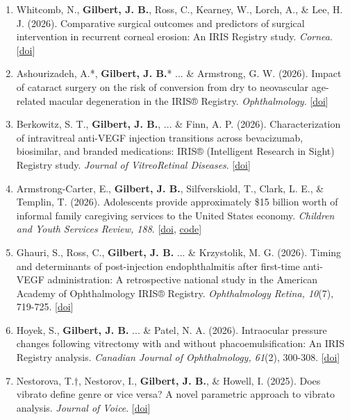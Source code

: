\documentclass[11pt]{article}
\begin{document}
\begin{enumerate}
\item Whitcomb, N., \textbf{Gilbert, J. B.}, Ross, C., Kearney, W., Lorch, A., \& Lee, H. J. (2026). Comparative surgical outcomes and predictors of surgical intervention in recurrent corneal erosion: An IRIS Registry study. \textit{Cornea}. [\href{https://www.ovid.com/jnls/corneajrnl/abstract/10.1097/ico.0000000000004338~surgical-management-patterns-and-outcomes-in-recurrent?redirectionsource=fulltextview}{doi}]
\item Ashourizadeh, A.*, \textbf{Gilbert, J. B.}* ... \& Armstrong, G. W. (2026). Impact of cataract surgery on the risk of conversion from dry to neovascular age-related macular degeneration in the IRIS® Registry. \textit{Ophthalmology}. [\href{https://www.aaojournal.org/article/S0161-6420(26)00420-3/abstract}{doi}] \label{amd_cat}
\item Berkowitz, S. T., \textbf{Gilbert, J. B.}, ... \& Finn, A. P. (2026). Characterization of intravitreal anti-VEGF injection transitions across bevacizumab, biosimilar, and branded medications: IRIS® (Intelligent Research in Sight) Registry study. \textit{Journal of VitreoRetinal Diseases}. [\href{https://doi.org/10.1177/24741264261455206}{doi}]
\item Armstrong-Carter, E., \textbf{Gilbert, J. B.}, Silfverskiold, T., Clark, L. E., \& Templin, T. (2026). Adolescents provide approximately \$15 billion worth of informal family caregiving services to the United States economy. \textit{Children and Youth Services Review, 188}. [\href{https://doi.org/10.1016/j.childyouth.2026.109121}{doi}, \href{https://researchbox.org/2759}{code}]
\item Ghauri, S., Ross, C., \textbf{Gilbert, J. B.} ... \& Krzystolik, M. G. (2026). Timing and determinants of post-injection endophthalmitis after first-time anti-VEGF administration: A retrospective national study in the American Academy of Ophthalmology IRIS® Registry. \textit{Ophthalmology Retina, 10}(7), 719-725. [\href{https://doi.org/10.1016/j.oret.2026.03.015}{doi}]
\item Hoyek, S., \textbf{Gilbert, J. B.} ... \& Patel, N. A. (2026). Intraocular pressure changes following vitrectomy with and without phacoemulsification: An IRIS Registry analysis. \textit{Canadian Journal of Ophthalmology, 61}(2), 300-308. [\href{https://doi.org/10.1016/j.jcjo.2025.08.008}{doi}]
\item Nestorova, T.$\dagger$, Nestorov, I., \textbf{Gilbert, J. B.}, \& Howell, I. (2025). Does vibrato define genre or vice versa? A novel parametric approach to vibrato analysis. \textit{Journal of Voice}. [\href{https://doi.org/10.1016/j.jvoice.2025.02.046}{doi}]

\end{enumerate}
\end{document}
